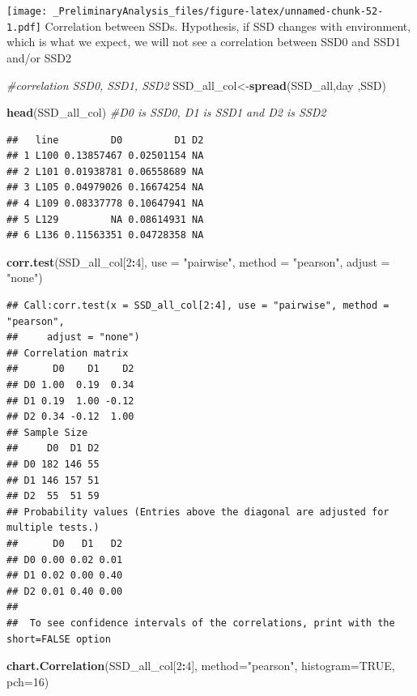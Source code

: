 \documentclass[
]{article}
\newenvironment{Shaded}{\begin{snugshade}}{\end{snugshade}}
\newcommand{\CommentTok}[1]{\textcolor[rgb]{0.56,0.35,0.01}{\textit{#1}}}
\newcommand{\DataTypeTok}[1]{\textcolor[rgb]{0.13,0.29,0.53}{#1}}
\newcommand{\DecValTok}[1]{\textcolor[rgb]{0.00,0.00,0.81}{#1}}
\newcommand{\KeywordTok}[1]{\textcolor[rgb]{0.13,0.29,0.53}{\textbf{#1}}}
\newcommand{\NormalTok}[1]{#1}
\newcommand{\OperatorTok}[1]{\textcolor[rgb]{0.81,0.36,0.00}{\textbf{#1}}}
\newcommand{\OtherTok}[1]{\textcolor[rgb]{0.56,0.35,0.01}{#1}}
\newcommand{\StringTok}[1]{\textcolor[rgb]{0.31,0.60,0.02}{#1}}
\begin{document}
\texttt{[image: \_PreliminaryAnalysis\_files/figure-latex/unnamed-chunk-52-1.pdf]}
Correlation between SSDs. Hypothesis, if SSD changes with environment,
which is what we expect, we will not see a correlation between SSD0 and
SSD1 and/or SSD2

\begin{Shaded}
\begin{Highlighting}[]
\CommentTok{#correlation SSD0, SSD1, SSD2}
\NormalTok{SSD_all_col<-}\KeywordTok{spread}\NormalTok{(SSD_all,day ,SSD)}

\KeywordTok{head}\NormalTok{(SSD_all_col) }\CommentTok{#D0 is SSD0, D1 is SSD1 and D2 is SSD2}
\end{Highlighting}
\end{Shaded}

\begin{verbatim}
##   line         D0         D1 D2
## 1 L100 0.13857467 0.02501154 NA
## 2 L101 0.01938781 0.06558689 NA
## 3 L105 0.04979026 0.16674254 NA
## 4 L109 0.08337778 0.10647941 NA
## 5 L129         NA 0.08614931 NA
## 6 L136 0.11563351 0.04728358 NA
\end{verbatim}

\begin{Shaded}
\begin{Highlighting}[]
\KeywordTok{corr.test}\NormalTok{(SSD_all_col[}\DecValTok{2}\OperatorTok{:}\DecValTok{4}\NormalTok{],}
          \DataTypeTok{use    =} \StringTok{"pairwise"}\NormalTok{,}
          \DataTypeTok{method =} \StringTok{"pearson"}\NormalTok{,}
          \DataTypeTok{adjust =} \StringTok{"none"}\NormalTok{)}
\end{Highlighting}
\end{Shaded}

\begin{verbatim}
## Call:corr.test(x = SSD_all_col[2:4], use = "pairwise", method = "pearson", 
##     adjust = "none")
## Correlation matrix 
##      D0    D1    D2
## D0 1.00  0.19  0.34
## D1 0.19  1.00 -0.12
## D2 0.34 -0.12  1.00
## Sample Size 
##     D0  D1 D2
## D0 182 146 55
## D1 146 157 51
## D2  55  51 59
## Probability values (Entries above the diagonal are adjusted for multiple tests.) 
##      D0   D1   D2
## D0 0.00 0.02 0.01
## D1 0.02 0.00 0.40
## D2 0.01 0.40 0.00
## 
##  To see confidence intervals of the correlations, print with the short=FALSE option
\end{verbatim}

\begin{Shaded}
\begin{Highlighting}[]
\KeywordTok{chart.Correlation}\NormalTok{(SSD_all_col[}\DecValTok{2}\OperatorTok{:}\DecValTok{4}\NormalTok{],}
                   \DataTypeTok{method=}\StringTok{"pearson"}\NormalTok{,}
                   \DataTypeTok{histogram=}\OtherTok{TRUE}\NormalTok{,}
                   \DataTypeTok{pch=}\DecValTok{16}\NormalTok{)}
\end{Highlighting}
\end{Shaded}
\end{document}
